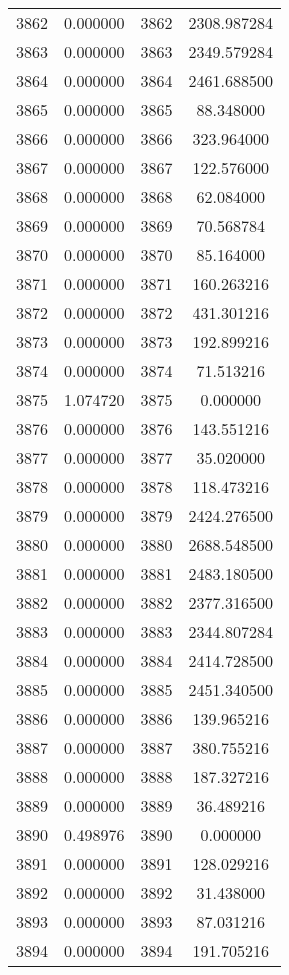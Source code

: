 \documentclass[12pt]{article}
\begin{document}
\begin{longtable}{@{}cccc@{}}
3862 & 0.000000 & 3862 & 2308.987284 \\
3863 & 0.000000 & 3863 & 2349.579284 \\
3864 & 0.000000 & 3864 & 2461.688500 \\
3865 & 0.000000 & 3865 & 88.348000 \\
3866 & 0.000000 & 3866 & 323.964000 \\
3867 & 0.000000 & 3867 & 122.576000 \\
3868 & 0.000000 & 3868 & 62.084000 \\
3869 & 0.000000 & 3869 & 70.568784 \\
3870 & 0.000000 & 3870 & 85.164000 \\
3871 & 0.000000 & 3871 & 160.263216 \\
3872 & 0.000000 & 3872 & 431.301216 \\
3873 & 0.000000 & 3873 & 192.899216 \\
3874 & 0.000000 & 3874 & 71.513216 \\
3875 & 1.074720 & 3875 & 0.000000 \\
3876 & 0.000000 & 3876 & 143.551216 \\
3877 & 0.000000 & 3877 & 35.020000 \\
3878 & 0.000000 & 3878 & 118.473216 \\
3879 & 0.000000 & 3879 & 2424.276500 \\
3880 & 0.000000 & 3880 & 2688.548500 \\
3881 & 0.000000 & 3881 & 2483.180500 \\
3882 & 0.000000 & 3882 & 2377.316500 \\
3883 & 0.000000 & 3883 & 2344.807284 \\
3884 & 0.000000 & 3884 & 2414.728500 \\
3885 & 0.000000 & 3885 & 2451.340500 \\
3886 & 0.000000 & 3886 & 139.965216 \\
3887 & 0.000000 & 3887 & 380.755216 \\
3888 & 0.000000 & 3888 & 187.327216 \\
3889 & 0.000000 & 3889 & 36.489216 \\
3890 & 0.498976 & 3890 & 0.000000 \\
3891 & 0.000000 & 3891 & 128.029216 \\
3892 & 0.000000 & 3892 & 31.438000 \\
3893 & 0.000000 & 3893 & 87.031216 \\
3894 & 0.000000 & 3894 & 191.705216 \\

\end{longtable}
\end{document}

